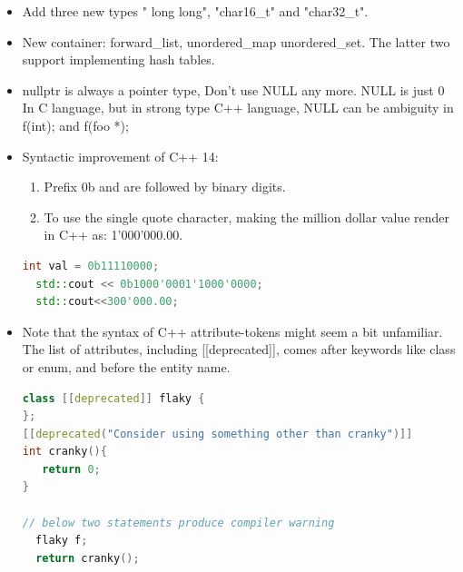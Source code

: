 \documentclass[a4paper,12pt,twoside]{book}
\begin{document}
\begin{itemize}
\item Add three new types " long long", "char16\_t"  and "char32\_t".

\item New container: forward\_list, unordered\_map unordered\_set.  The latter two support implementing hash tables.

\item nullptr is always a pointer type, Don't use NULL any more. NULL is just 0 In C language, but in strong type C++ language, NULL can be ambiguity in f(int); and f(foo *);

\item Syntactic improvement of C++ 14:
\begin{enumerate}
\item Prefix 0b and are followed by binary digits.
\item To use the single quote character, making the million dollar value render in C++ as: 1'000'000.00.
\end{enumerate}
\begin{lstlisting}[frame=single, language=c++]
  int val = 0b11110000;
  std::cout << 0b1000'0001'1000'0000;
  std::cout<<300'000.00;
\end{lstlisting}

\item Note that the syntax of C++ attribute-tokens might seem a bit unfamiliar. The list of attributes, including [[deprecated]], comes after keywords like class or enum, and before the entity name.

\begin{lstlisting}[frame=single, language=c++]
class [[deprecated]] flaky {
};
[[deprecated("Consider using something other than cranky")]]
int cranky(){
   return 0;
}

// below two statements produce compiler warning
  flaky f;
  return cranky();
\end{lstlisting}

\end{itemize}
\end{document}
